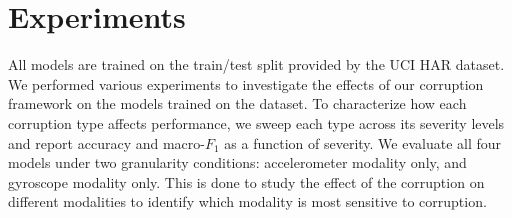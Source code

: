 \section{Experiments}
All models are trained on the train/test split provided by the UCI HAR dataset.
We performed various experiments to investigate the effects of our corruption framework on the
models trained on the dataset.
To characterize how each corruption type affects performance, we sweep each type across its
severity levels and report accuracy and macro-$F_1$ as a function of severity. We evaluate all four
models under two granularity conditions: accelerometer modality only, and gyroscope modality only.
This is done to study the effect of the corruption on different modalities to identify which modality
is most sensitive to corruption.

